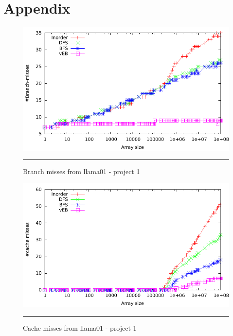 
\chapter{Appendix} %

\label{AppendixA} %

\begin{figure}[ht]
	\centering
		\includegraphics[width=\textwidth]{./Appendices/Figures/Project1/Branch_misses-Putty.pdf}
		\rule{35em}{0.5pt}
	\caption[Branch misses]{
	Branch misses from llama01 - project 1
	}
	\label{fig:Branch_misses_p1putty}
\end{figure}
\begin{figure}[ht]
	\centering
		\includegraphics[width=\textwidth]{./Appendices/Figures/Project1/Cache_misses-putty.pdf}
		\rule{35em}{0.5pt}
	\caption[Cache misses]{
	Cache misses from llama01 - project 1
	}
	\label{fig:Cache_misses_p1putty}
\end{figure}
